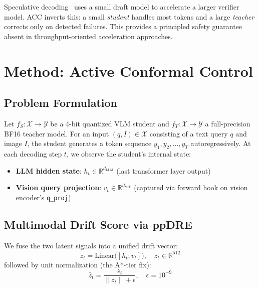 \documentclass[runningheads]{llncs}
\begin{document}
Speculative decoding~\cite{chen2023speculativedecoding} uses a small draft
model to accelerate a larger verifier model. ACC inverts this: a small
\emph{student} handles most tokens and a large \emph{teacher} corrects only
on detected failures. This provides a principled safety guarantee absent
in throughput-oriented acceleration approaches.

\section{Method: Active Conformal Control}
\label{sec:method}

\subsection{Problem Formulation}

Let $f_S: \mathcal{X} \to \mathcal{Y}$ be a 4-bit quantized VLM student
and $f_T: \mathcal{X} \to \mathcal{Y}$ a full-precision BF16 teacher model.
For an input $(q, I) \in \mathcal{X}$ consisting of a text query $q$ and
image $I$, the student generates a token sequence
$y_1, y_2, \ldots, y_T$ autoregressively. At each decoding step $t$,
we observe the student's internal state:
\begin{itemize}[itemsep=0pt]
  \item \textbf{LLM hidden state}: $h_t \in \mathbb{R}^{d_\mathrm{LLM}}$
    (last transformer layer output)
  \item \textbf{Vision query projection}: $v_t \in \mathbb{R}^{d_\mathrm{ViT}}$
    (captured via forward hook on vision encoder's \texttt{q\_proj})
\end{itemize}

\subsection{Multimodal Drift Score via ppDRE}

We fuse the two latent signals into a unified drift vector:
\begin{equation}
  z_t = \mathrm{Linear}\bigl([h_t; v_t]\bigr), \quad z_t \in \mathbb{R}^{512}
\end{equation}
followed by unit normalization (the A*-tier fix):
\begin{equation}
  \hat{z}_t = \frac{z_t}{\|z_t\| + \epsilon}, \quad \epsilon = 10^{-9}
  \label{eq:unitnorm}
\end{equation}
\end{document}
